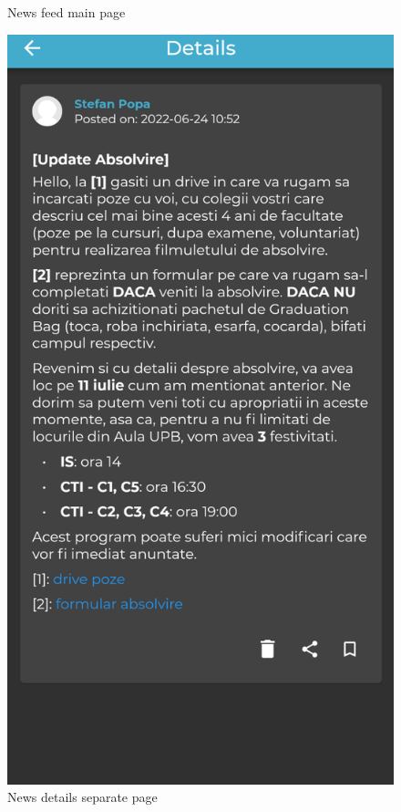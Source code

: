 \begin{figure}[!ht]
\begin{minipage}[b]{0.32\textwidth}
        \caption{News feed main page}
        \label{4:fig:news-feed-final}
    \end{minipage}
    \hfill
    \begin{minipage}[b]{0.32\textwidth}
        \captionsetup{justification=centering}
        \includegraphics[width=\textwidth]{figures/app/final/news-details-final.png}
        \caption{News details separate page}
        \label{4:fig:news-details-final}
    \end{minipage}
\end{figure}

